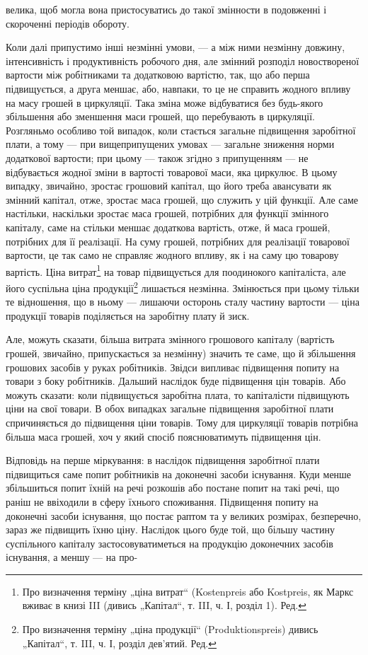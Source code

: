 велика, щоб могла вона пристосуватись до такої змінности в подовженні
і скороченні періодів обороту.

Коли далі припустимо інші незмінні умови, — а між ними незмінну
довжину, інтенсивність і продуктивність робочого дня, але змінний
розподіл новоствореної вартости між робітниками та додатковою
вартістю, так, що або перша підвищується, а друга меншає,
або, навпаки, то це не справить жодного впливу на масу грошей в
циркуляції. Така зміна може відбуватися без будь-якого збільшення або
зменшення маси грошей, що перебувають в циркуляції. Розгляньмо особливо
той випадок, коли стається загальне підвищення заробітної плати,
а тому — при вищеприпущених умовах — загальне зниження норми додаткової
вартости; при цьому — також згідно з припущенням — не відбувається
жодної зміни в вартості товарової маси, яка циркулює. В цьому
випадку, звичайно, зростає грошовий капітал, що його треба авансувати
як змінний капітал, отже, зростає маса грошей, що служить у цій
функції. Але саме настільки, наскільки зростає маса грошей, потрібних
для функції змінного капіталу, саме на стільки меншає додаткова вартість,
отже, й маса грошей, потрібних для її реалізації. На суму грошей,
потрібних для реалізації товарової вартости, це так само не справляє
жодного впливу, як і на саму цю товарову вартість. Ціна витрат\footnote*{
Про визначення терміну „ціна витрат“ (Kostenpreis або Kostpreis, як Маркс
вживає в книзі III (дивись „Капітал“, т. III, ч. І, розділ 1). Ред.
} на
товар підвищується для поодинокого капіталіста, але його суспільна ціна
продукції\footnote*{
Про визначення терміну „ціна продукції“ (Produktionspreis) дивись „Капітал“,
т. III, ч. І, розділ дев’ятий. Ред.
} лишається незмінна. Змінюється при цьому тільки те відношення,
що в ньому — лишаючи осторонь сталу частину вартости — ціна
продукції товарів поділяється на заробітну плату й зиск.

Але, можуть сказати, більша витрата змінного грошового капіталу
(вартість грошей, звичайно, припускається за незмінну) значить те саме,
що й збільшення грошових засобів у руках робітників. Звідси випливає
підвищення попиту на товари з боку робітників. Дальший наслідок буде
підвищення цін товарів. Або можуть сказати: коли підвищується заробітна
плата, то капіталісти підвищують ціни на свої товари. В обох випадках
загальне підвищення заробітної плати спричиняється до підвищення ціни
товарів. Тому для циркуляції товарів потрібна більша маса грошей, хоч
у який спосіб пояснюватимуть підвищення цін.

Відповідь на перше міркування: в наслідок підвищення заробітної
плати підвищиться саме попит робітників на доконечні засоби існування.
Куди менше збільшиться попит їхній на речі розкошів або постане попит
на такі речі, що раніш не ввіходили в сферу їхнього споживання. Підвищення
попиту на доконечні засоби існування, що постає раптом та у
великих розмірах, безперечно, зараз же підвищить їхню ціну. Наслідок
цього буде той, що більшу частину суспільного капіталу застосовуватиметься
на продукцію доконечних засобів існування, а меншу — на про-